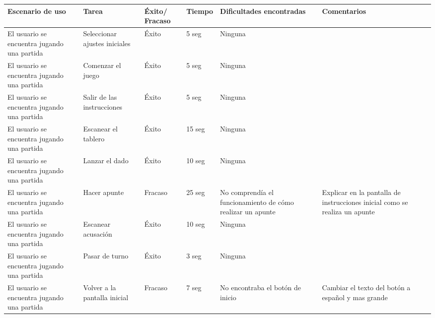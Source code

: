 \begin{table}
  \begin{center}
    \begin{tabular}{|p{2.5cm}|p{1.75cm}|p{1.25cm}|p{1.25cm}|p{2.75cm}|p{3.5cm}|}

      \hline
        \rowcolor{Gray} \textbf{Escenario de uso}
        & \textbf{Tarea}
        & \textbf{Éxito/ Fracaso}
        & \textbf{Tiempo}
        & \textbf{Dificultades encontradas}
        & \textbf{Comentarios}\\

      \hline
      El usuario se encuentra jugando una partida
      & Seleccionar ajustes iniciales
      & Éxito
      & 5 seg
      & Ninguna
      &\\

      \hline
      El usuario se encuentra jugando una partida
      & Comenzar el juego
      & Éxito
      & 5 seg
      & Ninguna
      &\\

      \hline
      El usuario se encuentra jugando una partida
      & Salir de las instrucciones
      & Éxito
      & 5 seg
      & Ninguna
      &\\

      \hline
      El usuario se encuentra jugando una partida
      & Escanear el tablero
      & Éxito
      & 15 seg
      & Ninguna
      &\\

      \hline
      El usuario se encuentra jugando una partida
      & Lanzar el dado
      & Éxito
      & 10 seg
      & Ninguna
      & \\

      \hline
      El usuario se encuentra jugando una partida
      & Hacer apunte
      & Fracaso
      & 25 seg
      & No comprendía el funcionamiento de cómo realizar un apunte
      & Explicar en la pantalla de instrucciones inicial como se realiza un apunte\\

      \hline
      El usuario se encuentra jugando una partida
      & Escanear acusación
      & Éxito
      & 10 seg
      & Ninguna
      &\\

      \hline
      El usuario se encuentra jugando una partida
      & Pasar de turno
      & Éxito
      & 3 seg
      & Ninguna
      &\\

      \hline
      El usuario se encuentra jugando una partida
      & Volver a la pantalla inicial
      & Fracaso
      & 7 seg
      & No encontraba el botón de inicio
      & Cambiar el texto del botón a español y mas grande\\


\end{tabular}
\end{center}
\end{table}
